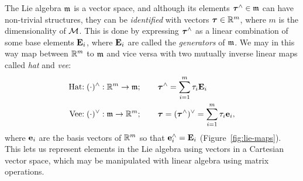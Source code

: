 The Lie algebra ${\mathfrak{m}}$ is a vector space, and although its elements ${\boldsymbol{\mathbf{\tau}}}^\wedge \in {\mathfrak{m}}$ can have non-trivial structures, they can be \emph{identified} with vectors ${\boldsymbol{\mathbf{\tau}}} \in {\mathbb R}^m$, where $m$ is the dimensionality of $\mathcal{M}$.
This is done by expressing ${\boldsymbol{\mathbf{\tau}}}^\wedge$ as a linear combination of some base elements ${\boldsymbol{\mathbf{E}}}_i$, where ${\boldsymbol{\mathbf{E}}}_i$ are called the \emph{generators} of ${\mathfrak{m}}$.
We may in this way map between ${\mathbb R}^m$ to ${\mathfrak{m}}$ and vice versa with two mutually inverse linear maps called \emph{hat} and \emph{vee}:
\begin{align}
  \text{Hat:} \;& (\cdot)^\wedge : {\mathbb R}^m \to {\mathfrak{m}} ; \quad\quad {\boldsymbol{\mathbf{\tau}}}^\wedge = \sum_{i = 1}^m \tau_i {\boldsymbol{\mathbf{E}}}_i\\
  \text{Vee:} \;& (\cdot)^\vee : {\mathfrak{m}} \to {\mathbb R}^m ; \quad\quad {\boldsymbol{\mathbf{\tau}}} = ({\boldsymbol{\mathbf{\tau}}}^\wedge)^\vee = \sum_{i = 1}^m \tau_i {\boldsymbol{\mathbf{e}}}_i,
\end{align}
where ${\boldsymbol{\mathbf{e}}}_i$ are the basis vectors of ${\mathbb R}^m$ so that ${\boldsymbol{\mathbf{e}}}^\wedge_i = {\boldsymbol{\mathbf{E}}}_i$ (Figure~\ref{fig:lie-maps}).
This lets us represent elements in the Lie algebra using vectors in a Cartesian vector space, which may be manipulated with linear algebra using matrix operations.


